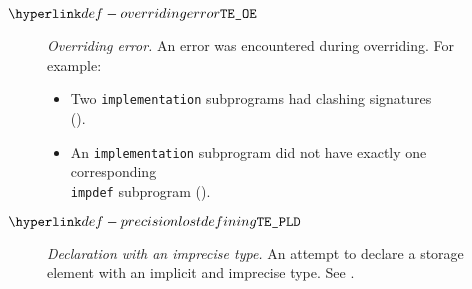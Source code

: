 \begin{description}
\hypertarget{def-overridingerror}{}
\item[$\OverridingError$]
  \textit{Overriding error.}
  An error was encountered during overriding.
  For example:
  \begin{itemize}
    \item Two \texttt{implementation} subprograms had clashing signatures \\ ().
    \item An \texttt{implementation} subprogram did not have exactly one corresponding \\
          \texttt{impdef} subprogram ().
  \end{itemize}

\item[$\PrecisionLostDefining$]%
  \hypertarget{def-precisionlostdefining}{}
  \textit{Declaration with an imprecise type.}
  An attempt to declare a storage element with an implicit and imprecise type.
  See .
\end{description}


